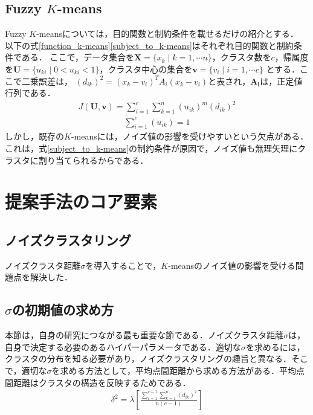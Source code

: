 \documentclass[10pt,onecolumn]{jsarticle}
\begin{document}
\subsection{Fuzzy $K$-means}
Fuzzy $K$-meansについては，目的関数と制約条件を載せるだけの紹介とする．
以下の式\eqref{function_k-means}\eqref{subject_to_k-means}はそれぞれ目的関数と制約条件である．
ここで，データ集合を$\bm{X} = \{x_k \mid k= 1, \cdots n\}$，クラスタ数を$c$，帰属度を$\bm{U}=\{u_{ki}\mid 0 < u_{ki} < 1\}$，クラスタ中心の集合を$\bm{v}=\{v_i \mid i= 1,\cdots c \}$
とする．ここで二乗誤差は，
$\left(d_{i k}\right)^{2}=\left( x_{k}-v_{i}\right)^{T} A_{i}\left( x_{k}-v_{i}\right)$と表され，$\bm{A_i}$は，正定値行列である．
\begin{align}
	\label{function_k-means}
	J(\bm{U}, \bm{v})=\sum_{i=1}^{c} \sum_{k=1}^{n}\left(u_{i k}\right)^{m}\left(d_{i k}\right)^{2}
\end{align}
\begin{align}
	\label{subject_to_k-means}
	\sum_{i=1}^{c}\left(u_{i k}\right)=1
\end{align}
しかし，既存の$K$-meansには，ノイズ値の影響を受けやすいという欠点がある．これは，式\eqref{subject_to_k-means}の制約条件が原因で，ノイズ値も無理矢理にクラスタに割り当てられるからである．

\section{提案手法のコア要素}
\subsection{ノイズクラスタリング}
ノイズクラスタ距離$\sigma$を導入することで，$K$-meansのノイズ値の影響を受ける問題点を解決した．
\subsection{$\sigma$の初期値の求め方 }
本節は，自身の研究につながる最も重要な節である．ノイズクラスタ距離$\sigma$は，自身で決定する必要のあるハイパーパラメータである．適切な$\sigma$を求めるには，クラスタの分布を知る必要があり，ノイズクラスタリングの趣旨と異なる．そこで，適切な$\sigma$を求める方法として，平均点間距離から求める方法がある．平均点間距離はクラスタの構造を反映するためである．
\begin{align}
	\delta^{2}=\lambda\left[\frac{\sum_{i=1}^{c-1} \sum_{k=1}^{n}\left(d_{i k}\right)^{2}}{n(c-1)}\right]
\end{align}
\end{document}
